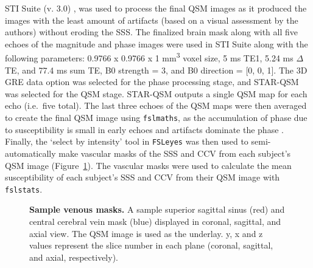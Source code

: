 \documentclass[
true
]{sn-jnl}
\begin{document}
STI Suite (v. 3.0) \citep{liIntegratedLaplacianbasedPhase2014}, was used
to process the final QSM images as it produced the images with the least
amount of artifacts (based on a visual assessment by the authors)
without eroding the SSS. The finalized brain mask along with all five
echoes of the magnitude and phase images were used in STI Suite along
with the following parameters: 0.9766 x 0.9766 x 1 mm\textsuperscript{3}
voxel size, 5 ms TE1, 5.24 ms \(\Delta\)TE, and 77.4 ms sum TE, B0
strength = 3, and B0 direction = {[}0, 0, 1{]}. The 3D GRE data option
was selected for the phase processing stage, and STAR-QSM was selected
for the QSM stage. STAR-QSM outputs a single QSM map for each echo
(i.e.~five total). The last three echoes of the QSM maps were then
averaged to create the final QSM image using \texttt{fslmaths}, as the
accumulation of phase due to susceptibility is small in early echoes and
artifacts dominate the phase
\citep{zhangQuantitativeAnalysisPunctate2019}. Finally, the `select by
intensity' tool in \texttt{FSLeyes} was then used to semi-automatically
make vascular masks of the SSS and CCV from each subject's QSM image
(Figure~\ref{fig-masks}). The vascular masks were used to calculate the
mean susceptibility of each subject's SSS and CCV from their QSM image
with \texttt{fslstats}.

\begin{figure}[H]


\caption{\label{fig-masks}\textbf{Sample venous masks.} A sample
superior sagittal sinus (red) and central cerebral vein mask (blue)
displayed in coronal, sagittal, and axial view. The QSM image is used as
the underlay. y, x and z values represent the slice number in each plane
(coronal, sagittal, and axial, respectively).}

\end{figure}%
\end{document}
